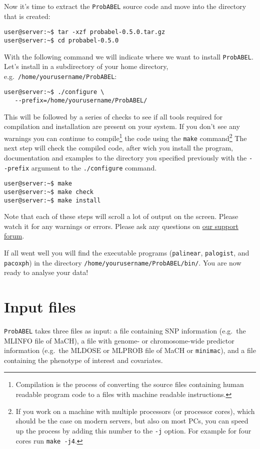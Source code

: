 \documentclass[12pt,a4paper]{article}
\newcommand{\PA}{\texttt{ProbABEL}}
\begin{document}
Now it's time to extract the \PA{} source code and move into the
directory that is created:
\begin{lstlisting}[basicstyle=\footnotesize\ttfamily,]
user@server:~$ tar -xzf probabel-0.5.0.tar.gz
user@server:~$ cd probabel-0.5.0
\end{lstlisting}
With the following command we will indicate where we want to install
\PA{}. Let's install in a subdirectory of your home directory,
e.g.~\texttt{/home/yourusername/ProbABEL}:
\begin{lstlisting}[basicstyle=\footnotesize\ttfamily,]
user@server:~$ ./configure \
   --prefix=/home/yourusername/ProbABEL/
\end{lstlisting}
This will be followed by a series of checks to see if all tools
required for compilation and installation are present on your
system. If you don't see any warnings you can continue to
compile\footnote{Compilation is the process of converting the source
  files containing human readable program code to a files with machine
  readable instructions.} the code using the \texttt{make}
command\footnote{If you work on a machine with multiple processors (or
  processor cores), which should be the case on modern servers, but
  also on most PCs, you can speed up the process by adding this number
  to the \texttt{-j} option. For example for four cores run
  \texttt{make -j4}.} The next step will check the compiled code,
after wich you install the program, documentation and examples to the
directory you specified previously with the \lstinline{--prefix} argument
to the \texttt{./configure} command.
\begin{lstlisting}[basicstyle=\footnotesize\ttfamily,]
user@server:~$ make
user@server:~$ make check
user@server:~$ make install
\end{lstlisting}
Note that each of these steps will scroll a lot of output on the
screen. Please watch it for any warnings or errors. Please ask any
questions on \href{http://forum.genabel.org/}{our support forum}.

If all went well you will find the executable programs
(\texttt{palinear}, \texttt{palogist}, and \texttt{pacoxph}) in the
directory \texttt{/home/yourusername/ProbABEL/bin/}. You are now ready
to analyse your data!

\section{Input files}
\PA{} takes three files as input: a file containing SNP
information (e.g.~the MLINFO file of MaCH), a file with genome- or
chromosome-wide predictor information (e.g.~the MLDOSE or MLPROB file
of MaCH or \texttt{minimac}),
and a file containing the phenotype of interest and covariates.
\end{document}
